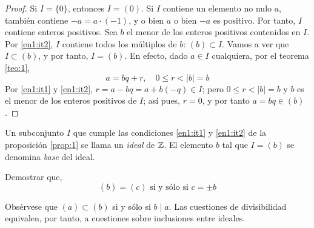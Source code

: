 \begin{proof}
    Si $I=\{0\}$, entonces $I=(0)$. Si $I$ contiene un elemento no nulo $a$, también contiene $-a=a\cdot(-1)$, y o bien $a$ o bien $-a$ es positivo. Por tanto, $I$ contiene enteros positivos. Sea $b$ el menor de los enteros positivos contenidos en $I$. Por \ref{en1:it2}, $I$ contiene todos los múltiplos de $b$: $(b)\subset I$. Vamos a ver que $I\subset (b)$, y por tanto, $I=(b)$. En efecto, dado $a\in I$ cualquiera, por el teorema \ref{teo:1},
    $$a=bq+r, \quad 0\leq r<|b|=b$$
    Por \ref{en1:it1} y \ref{en1:it2}, $r=a-bq=a+b(-q)\in I$; pero $0\leq r<|b|=b$ y $b$ es el menor de los enteros positivos de $I$; así pues, $r=0$, y por tanto $a=bq\in (b)$.
\end{proof}

Un subconjunto $I$ que cumple las condiciones \ref{en1:it1} y \ref{en1:it2} de la proposición \ref{prop:1} se llama un {\it ideal} de $\mathbb{Z}$. El elemento $b$ tal que $I=(b)$ se denomina {\it base} del ideal.

\begin{ejer}
    Demostrar que,
    $$(b)=(c)\text{ si y sólo si }c=\pm b$$
\end{ejer}

Obsérvese que $(a)\subset (b)$ si y sólo si $b\mid a$. Las cuestiones de divisibilidad equivalen, por tanto, a cuestiones sobre inclusiones entre ideales.